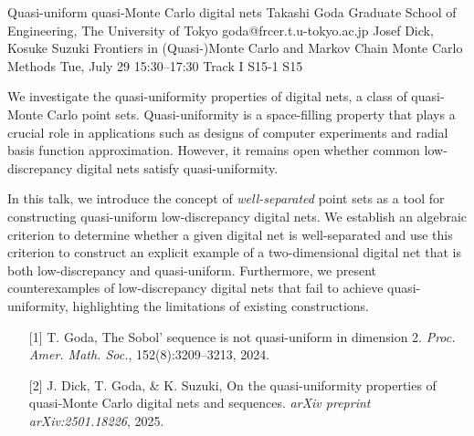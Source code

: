 \begin{talk}
  {Quasi-uniform quasi-Monte Carlo digital nets}%
  {Takashi Goda}%
  {Graduate School of Engineering, The University of Tokyo}%
  {goda@frcer.t.u-tokyo.ac.jp}%
  {Josef Dick, Kosuke Suzuki}%
  {Frontiers in (Quasi-)Monte Carlo and Markov Chain Monte Carlo Methods}%
  {Tue, July 29 15:30–17:30 Track I}%
  {S15-1}%
  {S15}%
				
			
We investigate the quasi-uniformity properties of digital nets, a class of quasi-Monte Carlo point sets. Quasi-uniformity is a space-filling property that plays a crucial role in applications such as designs of computer experiments and radial basis function approximation. However, it remains open whether common low-discrepancy digital nets satisfy quasi-uniformity.

In this talk, we introduce the concept of \emph{well-separated} point sets as a tool for constructing quasi-uniform low-discrepancy digital nets. We establish an algebraic criterion to determine whether a given digital net is well-separated and use this criterion to construct an explicit example of a two-dimensional digital net that is both low-discrepancy and quasi-uniform. Furthermore, we present counterexamples of low-discrepancy digital nets that fail to achieve quasi-uniformity, highlighting the limitations of existing constructions.

\begin{enumerate}
	\item[{[1]}] T. Goda, The Sobol’ sequence is not quasi-uniform in dimension 2. \emph{Proc. Amer. Math. Soc.}, 152(8):3209–3213, 2024.
	\item[{[2]}] J. Dick, T. Goda, \& K. Suzuki, On the quasi-uniformity properties of quasi-Monte Carlo digital nets and sequences. \emph{arXiv preprint arXiv:2501.18226}, 2025.
\end{enumerate}
\end{talk}

